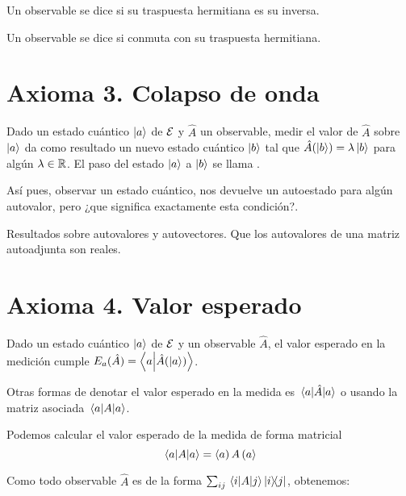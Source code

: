 \begin{definition}
	Un observable se dice  si su traspuesta hermitiana es su inversa.
\end{definition}

\begin{definition}
	Un observable se dice  si conmuta con su traspuesta hermitiana.
\end{definition}

\section{Axioma 3. Colapso de onda}\label{sec:axioma-3.-colapso-de-onda}
\begin{definition}[Axioma 3]
	Dado un estado cuántico $\ket{a}$ de $\mathcal{E}$ y $\hat{A}$ un observable, medir el valor de $\hat{A}$ sobre $\ket{a}$ da como resultado un nuevo estado cuántico $\ket{b}$ tal que $\hat{A}(\ket{b})=\lambda\ket{b}$ para algún $\lambda\in\mathbb{R}$.
	El paso del estado $\ket{a}$ a $\ket{b}$ se llama .
\end{definition}
Así pues, observar un estado cuántico, nos devuelve un autoestado para algún autovalor, pero ¿que significa exactamente esta condición?.

Resultados sobre autovalores y autovectores.
Que los autovalores de una matriz autoadjunta son reales.

\section{Axioma 4. Valor esperado}\label{sec:axioma-4.-valor-esperado}
\begin{definition}[Axioma 4]
	Dado un estado cuántico $\ket{a}$ de $\mathcal{E}$ y un observable $\hat{A}$, el valor esperado en la medición cumple $E_a(\hat{A})=\braket{a}{\hat{A}(\ket{a})}$.
\end{definition}
Otras formas de denotar el valor esperado en la medida es $\ev{\hat{A}}{a}$ o usando la matriz asociada $\ev{A}{a}$.

Podemos calcular el valor esperado de la medida de forma matricial
\begin{equation}
	\label{eq:valor-esperado-matriz}
	\ev{A}{a}=\bram{a}A\ketm{a}
\end{equation}

Como todo observable $\hat{A}$ es de la forma $\sum_{ij}\matrixelement{i}{A}{j}\ketbra{i}{j}$, obtenemos:

